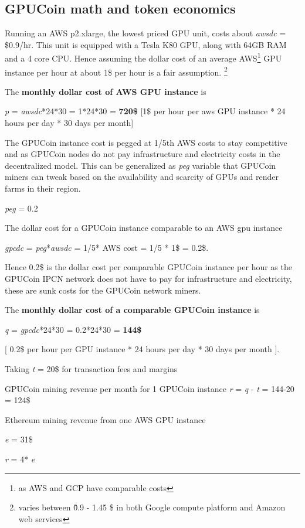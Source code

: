 \subsection{GPUCoin math and token economics}
Running an AWS p2.xlarge, the lowest priced GPU unit, costs about \emph{awsdc} = \$0.9/hr. This unit is equipped with a Tesla K80 GPU, along with 64GB RAM and a 4 core CPU. 
Hence assuming the dollar cost of an average AWS\footnote{as AWS and GCP have comparable costs} GPU instance per hour at about 1\$ per hour is a fair assumption. \footnote{ varies between \~ 0.9 - 1.45 \$ in both Google compute platform and Amazon web services}

The \textbf{monthly dollar cost of AWS GPU instance} is

\emph{p} = \emph{awsdc}*24*30 = 1*24*30 = \textbf{720\$  } [1\$ per hour per aws GPU instance * 24 hours per day * 30 days per month]


The GPUCoin instance cost is pegged at 1/5th AWS costs to stay competitive and as GPUCoin nodes do not pay infrastructure and electricity costs in the decentralized model. This can be generalized as \emph{peg} variable that GPUCoin miners can tweak based on the availability and scarcity of GPUs and render farms in their region.

\emph{peg} = 0.2

The dollar cost for a GPUCoin instance comparable to an AWS gpu instance 

\emph{gpcdc} = \emph{peg}*\emph{awsdc} =  1/5* AWS cost = 1/5 * 1\$ = 0.2\$.

Hence 0.2\$ is the dollar cost per comparable GPUCoin instance per hour as the GPUCoin IPCN network does not have to pay for infrastructure and electricity, these are sunk costs for the GPUCoin network miners.

The \textbf{monthly dollar cost of a comparable GPUCoin instance} is 

\emph{q} = \emph{gpcdc}*24*30 = 0.2*24*30 = \textbf{144\$ }

[ 0.2\$ per hour per GPU instance * 24 hours per day * 30 days per month ].


Taking \emph{t} = 20\$ for transaction fees and margins

GPUCoin mining revenue per month for 1 GPUCoin instance
\emph{r} = \emph{q} - \emph{t} = 144-20 = 124\$

Ethereum mining revenue from one AWS GPU instance

\emph{e} = 31\$

\emph{r} = 4* \emph{e}  


